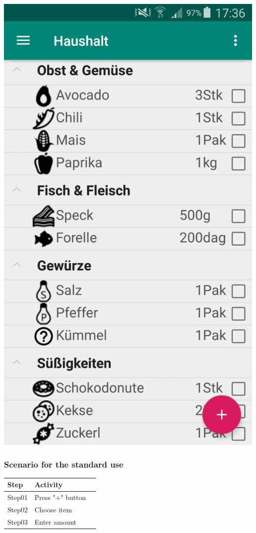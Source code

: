 \documentclass[12pt]{article}
\theoremstyle{definition}
\begin{document}
\includegraphics[scale=0.15]{GUI_Shoppinglist.png}
\\

\subsubsection{Scenario for the standard use}

\begin{tabular}{|l|l|l|}
\hline
Step & Activity \\ \hline
Step01 & Press "+" button \\ \hline
Step02 & Choose item \\ \hline
Step03 & Enter amount \\ \hline
\end{tabular}
\end{document}
